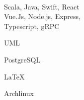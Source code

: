 \documentclass[11pt]{spidercv}
\begin{document}
\begin{SideBar}{\ColorBackground}{\ColorTextSide}


  \\
  \vspace{0.2cm}

  \vspace{1cm}

  \begin{ItemList}{\ColorHighlight}
    \item [\large\faCode] Scala, Java, Swift, React\\Vue.Js, Node.js, Express,\\ Typescript, gRPC
    \item [\large\faCubes] UML
    \item [\large\faDatabase] PostgreSQL
    \item [\large\faPencilSquareO] \LaTeX
    \item [\large\faLinux] Archlinux
  \end{ItemList}





\end{SideBar}
\end{document}
